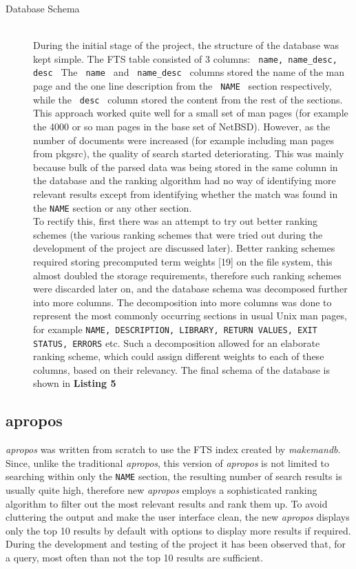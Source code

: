 \documentclass[letterpaper,twocolumn,10pt]{article}
\begin{document}
\begin{description}
\item[Database Schema] \hfill \\
During the initial stage of the project, the structure of the database was kept
simple. The FTS table consisted of 3 columns:
{\tt
name, name\_desc, desc
}
The
{\tt
name
}
and
{\tt
name\_desc
}
columns stored the name of the man page and the one line description from the
{\tt
NAME
}
section respectively, while the
{\tt
desc
}
column stored the content from the rest of the sections. This approach worked
quite well for a small set of man pages (for example the 4000 or so man pages in
the base set of NetBSD). However, as the number of documents were increased (for example including man pages from pkgsrc), the quality of search started deteriorating. This was mainly because bulk of the parsed data was being stored
in the same column in the database and the ranking algorithm had no way of
identifying more relevant results except from identifying whether the match was found in the {\tt NAME} section or any other section. \\

To rectify this, first there was an attempt to try out better ranking schemes
(the various ranking schemes that were tried out during the development of the
project are discussed later). Better ranking schemes required storing precomputed
term weights [19] on the file system, this almost doubled the storage requirements, therefore such ranking schemes were discarded later on, and the
database schema was decomposed further into more columns. The decomposition into
more columns was done to represent the most commonly occurring sections in usual Unix man pages, for example
{\tt NAME, DESCRIPTION, LIBRARY, RETURN VALUES, EXIT STATUS, ERRORS}
etc. Such a decomposition allowed for an elaborate ranking scheme, which could
assign different weights to each of these columns, based on their relevancy. The
final schema of the database is shown in {\bf Listing 5}
\end{description}

\subsection{apropos}
\textit{apropos} was written from scratch to use the FTS index created by
\textit{makemandb}. Since, unlike the traditional \textit{apropos}, this version
of \textit{apropos} is not limited to searching within only the {\tt NAME}
section, the resulting
number of search results is usually quite high, therefore new \textit{apropos}
employs a
sophisticated ranking algorithm to filter out the most relevant results and rank
them up. To avoid cluttering the output and make the user interface clean, the
new \textit{apropos} displays only the top 10 results by default with options
to display more results if required. During the development and testing of the
project it has been observed that, for a query, most often than not the top 10
results are sufficient. \\
\end{document}
